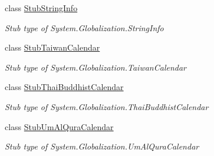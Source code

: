 \begin{DoxyCompactItemize}
class \hyperlink{class_system_1_1_globalization_1_1_fakes_1_1_stub_string_info}{Stub\-String\-Info}
\begin{DoxyCompactList}\small\item\em Stub type of System.\-Globalization.\-String\-Info\end{DoxyCompactList}\item 
class \hyperlink{class_system_1_1_globalization_1_1_fakes_1_1_stub_taiwan_calendar}{Stub\-Taiwan\-Calendar}
\begin{DoxyCompactList}\small\item\em Stub type of System.\-Globalization.\-Taiwan\-Calendar\end{DoxyCompactList}\item 
class \hyperlink{class_system_1_1_globalization_1_1_fakes_1_1_stub_thai_buddhist_calendar}{Stub\-Thai\-Buddhist\-Calendar}
\begin{DoxyCompactList}\small\item\em Stub type of System.\-Globalization.\-Thai\-Buddhist\-Calendar\end{DoxyCompactList}\item 
class \hyperlink{class_system_1_1_globalization_1_1_fakes_1_1_stub_um_al_qura_calendar}{Stub\-Um\-Al\-Qura\-Calendar}
\begin{DoxyCompactList}\small\item\em Stub type of System.\-Globalization.\-Um\-Al\-Qura\-Calendar\end{DoxyCompactList}\end{DoxyCompactItemize}
